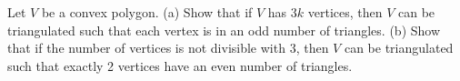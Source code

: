 Let $V$ be a convex polygon.
(a) Show that if $V$ has $3k$ vertices, then $V$ can be triangulated such that each vertex is in an odd number of triangles.
(b) Show that if the number of vertices is not divisible with 3, then $V$ can be triangulated such that exactly 2 vertices have an even number of triangles.